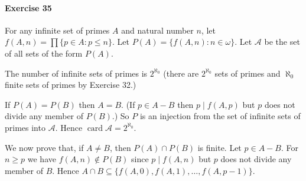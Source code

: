 \documentclass{report}
\newcommand{\card}{\ensuremath{\operatorname{card}}}
\begin{document}
    \paragraph{Exercise 35}
    For any infinite set of primes $A$ and natural number $n$, let $f(A,n) = \prod \{ p \in A : p \leq n \}$.
    Let $P(A) = \{ f(A,n) : n \in \omega \}$. Let $\mathcal{A}$ be the set of all sets of the form $P(A)$.

    The number of infinite sets of primes is $2^{\aleph_0}$ (there are $2^{\aleph_0}$ sets of primes and
    $\aleph_0$ finite sets of primes by Exercise 32.)

    If $P(A) = P(B)$ then $A = B$. (If $p \in A - B$ then $p \mid f(A,p)$ but $p$ does not divide any
    member of $P(B)$.) So $P$ is an
    injection from the set of infinite sets of primes into $\mathcal{A}$. Hence $\card \mathcal{A} =
    2^{\aleph_0}$.

    We now prove that, if $A \neq B$, then $P(A) \cap P(B)$ is finite. Let $p \in A - B$. For $n \geq p$
     we have $f(A,n) \notin P(B)$ since $p \mid f(A,n)$ but $p$ does not divide any member of $B$. Hence
     $A \cap B \subseteq \{ f(A,0), f(A,1), \ldots, f(A,p-1) \}$.
\end{document}
